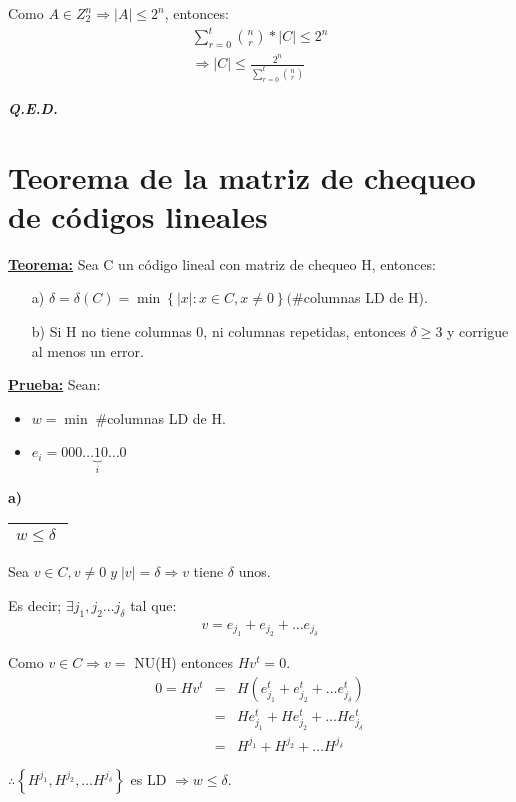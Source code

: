 \documentclass[12pt,a4paper]{report}
\newcounter{neq}
\newcommand{\QED}{\hfill \textit{\textbf{Q.E.D.}}}
\begin{document}
			\par Como $A \in Z_{2}^{n} \Rightarrow \lvert A\rvert \leq 2^{n}$, entonces:
			\begin{eqnarray}
				\nonumber \sum_{r = 0}^{t} {n \choose r} * \lvert C \rvert \leq 2^{n} \\
				\nonumber \Rightarrow \lvert C \rvert \leq \frac{2^{n}}{\sum_{r = 0}^{t} {n \choose r}}
			\end{eqnarray}

		\QED

	\section{Teorema de la matriz de chequeo de códigos lineales}
		\textbf{\underline{Teorema:}} Sea C un código lineal con matriz de chequeo H, entonces:
			\begin{itemize}
				\item[a)] $\delta = \delta(C) = \min \left\lbrace \lvert x \rvert : x \in C , x \neq 0 \right\rbrace (\#$columnas LD de H).
				\item[b)] Si H no tiene columnas 0, ni columnas repetidas, entonces $\delta \geq 3$ y corrigue al menos un error.
			\end{itemize}

		\textbf{\underline{Prueba:}} Sean:
			\begin{itemize}
				\item $w = \min \; \#$columnas LD de H.
				\item $e_{i} = 000 \dotsc \underbrace{1}_{i} 0 \dotsc 0$
			\end{itemize}

			\textbf{a)} 
			
			\begin{tabular}{|c|} \hline $w \leq \delta \; $ \\\hline \end{tabular} Sea $v \in C , v \neq 0 \; y \; \lvert v \rvert = \delta \Rightarrow v$ tiene $\delta$ unos.

			\vspace{3mm}
			\par Es decir; $\exists j_{1}, j_{2} \dotsc j_{\delta}$ tal que:
			\begin{eqnarray}
				\nonumber v = e_{j_{1}} + e_{j_{2}} + \dotsc e_{j_{\delta}}
			\end{eqnarray}

			\par Como $ v \in C \Rightarrow v =$ NU(H) entonces $Hv^{t} = 0$.
			\begin{eqnarray}
				\nonumber 0 = Hv^{t} &=& H(e_{j_{1}}^{t} + e_{j_{2}}^{t} + \dotsc e_{j_{\delta}}^{t}) \\
				\nonumber &=& H e_{j_{1}}^{t} + H e_{j_{2}}^{t} + \dotsc H e_{j_{\delta}}^{t} \\
				\nonumber &=& H^{j_{1}} + H^{j_{2}} + \dotsc H^{j_{\delta}}
			\end{eqnarray}
			\par $\therefore \left\lbrace H^{j_{1}}, H^{j_{2}}, \dotsc H^{j_{\delta}} \right\rbrace$ es LD $\Rightarrow w \leq \delta$.
\end{document}
